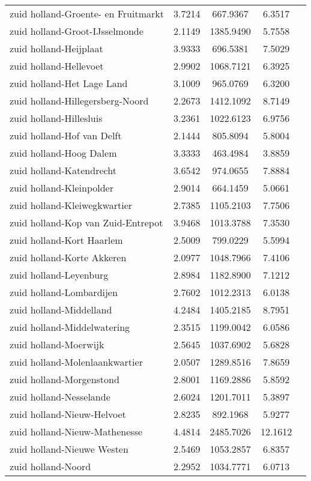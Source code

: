 \begin{longtable}{llccc}
zuid holland-Groente- en Fruitmarkt & 3.7214 & 667.9367 & 6.3517 \\
zuid holland-Groot-IJsselmonde & 2.1149 & 1385.9490 & 5.7558 \\
zuid holland-Heijplaat & 3.9333 & 696.5381 & 7.5029 \\
zuid holland-Hellevoet & 2.9902 & 1068.7121 & 6.3925 \\
zuid holland-Het Lage Land & 3.1009 & 965.0769 & 6.3200 \\
zuid holland-Hillegersberg-Noord & 2.2673 & 1412.1092 & 8.7149 \\
zuid holland-Hillesluis & 3.2361 & 1022.6123 & 6.9756 \\
zuid holland-Hof van Delft & 2.1444 & 805.8094 & 5.8004 \\
zuid holland-Hoog Dalem & 3.3333 & 463.4984 & 3.8859 \\
zuid holland-Katendrecht & 3.6542 & 974.0655 & 7.8884 \\
zuid holland-Kleinpolder & 2.9014 & 664.1459 & 5.0661 \\
zuid holland-Kleiwegkwartier & 2.7385 & 1105.2103 & 7.7506 \\
zuid holland-Kop van Zuid-Entrepot & 3.9468 & 1013.3788 & 7.3530 \\
zuid holland-Kort Haarlem & 2.5009 & 799.0229 & 5.5994 \\
zuid holland-Korte Akkeren & 2.0977 & 1048.7966 & 7.4106 \\
zuid holland-Leyenburg & 2.8984 & 1182.8900 & 7.1212 \\
zuid holland-Lombardijen & 2.7602 & 1012.2313 & 6.0138 \\
zuid holland-Middelland & 4.2484 & 1405.2185 & 8.7951 \\
zuid holland-Middelwatering & 2.3515 & 1199.0042 & 6.0586 \\
zuid holland-Moerwijk & 2.5645 & 1037.6902 & 5.6828 \\
zuid holland-Molenlaankwartier & 2.0507 & 1289.8516 & 7.8659 \\
zuid holland-Morgenstond & 2.8001 & 1169.2886 & 5.8592 \\
zuid holland-Nesselande & 2.6024 & 1201.7011 & 5.3897 \\
zuid holland-Nieuw-Helvoet & 2.8235 & 892.1968 & 5.9277 \\
zuid holland-Nieuw-Mathenesse & 4.4814 & 2485.7026 & 12.1612 \\
zuid holland-Nieuwe Westen & 2.5469 & 1053.2857 & 6.8357 \\
zuid holland-Noord & 2.2952 & 1034.7771 & 6.0713 \\

\end{longtable}
